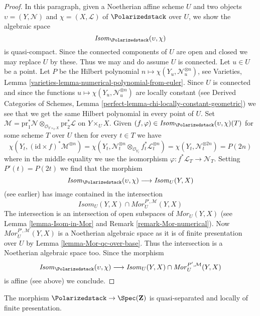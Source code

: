 \begin{proof}
\medskip\noindent
In this paragraph, given a Noetherian affine scheme $U$ and two objects
$\upsilon = (Y, \mathcal{N})$ and $\chi = (X, \mathcal{L})$
of $\Polarizedstack$ over $U$, we show the algebraic space
$$
\mathit{Isom}_{\Polarizedstack}(\upsilon, \chi)
$$
is quasi-compact. Since the connected components of $U$ are open and closed
we may replace $U$ by these. Thus we may and do assume $U$ is connected.
Let $u \in U$ be a point. Let $P$ be the Hilbert polynomial
$n \mapsto \chi(Y_u, \mathcal{N}_u^{\otimes n})$, see
Varieties, Lemma \ref{varieties-lemma-numerical-polynomial-from-euler}.
Since $U$ is connected and since
the functions $u \mapsto \chi(Y_u, \mathcal{N}_u^{\otimes n})$
are locally constant (see 
Derived Categories of Schemes, Lemma
\ref{perfect-lemma-chi-locally-constant-geometric})
we see that we get the same Hilbert polynomial in every point of $U$.
Set
$\mathcal{M} = \text{pr}_1^*\mathcal{N}
\otimes_{\mathcal{O}_{Y \times_U X}} \text{pr}_2^*\mathcal{L}$
on $Y \times_U X$. Given
$(f, \varphi) \in \mathit{Isom}_{\Polarizedstack}(\upsilon, \chi)(T)$
for some scheme $T$ over $U$ then for every $t \in T$ we have
$$
\chi(Y_t, (\text{id} \times f)^*\mathcal{M}^{\otimes n}) =
\chi(Y_t,
\mathcal{N}_t^{\otimes n} \otimes_{\mathcal{O}_{Y_t}}
f_t^*\mathcal{L}_t^{\otimes n}) =
\chi(Y_t, \mathcal{N}_t^{\otimes 2n}) = P(2n)
$$
where in the middle equality we use the isomorphism
$\varphi : f^*\mathcal{L}_T \to \mathcal{N}_T$.
Setting $P'(t) = P(2t)$ we find that the morphism
$$
\mathit{Isom}_{\Polarizedstack}(\upsilon, \chi)
\longrightarrow
\mathit{Isom}_U(Y, X)
$$
(see earlier) has image contained in the intersection
$$
\mathit{Isom}_U(Y, X) \cap \mathit{Mor}^{P', \mathcal{M}}_U(Y, X)
$$
The intersection is an intersection of open subspaces of
$\mathit{Mor}_U(Y, X)$ (see Lemma \ref{lemma-Isom-in-Mor} and
Remark \ref{remark-Mor-numerical}).
Now $\mathit{Mor}^{P', \mathcal{M}}_U(Y, X)$
is a Noetherian algebraic space as it is of finite
presentation over $U$ by Lemma \ref{lemma-Mor-qc-over-base}.
Thus the intersection
is a Noetherian algebraic space too. Since the morphism
$$
\mathit{Isom}_{\Polarizedstack}(\upsilon, \chi)
\longrightarrow
\mathit{Isom}_U(Y, X) \cap \mathit{Mor}^{P', \mathcal{M}}_U(Y, X)
$$
is affine (see above) we conclude.
\end{proof}

\begin{lemma}
\label{lemma-polarized-qs-lfp}
The morphism $\Polarizedstack \to \Spec(\mathbf{Z})$ is quasi-separated and
locally of finite presentation.
\end{lemma}

